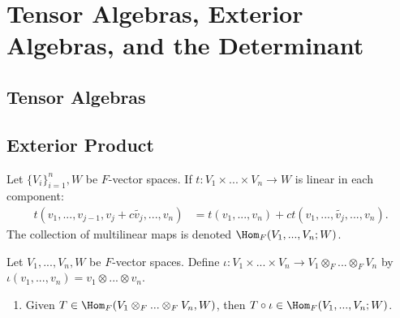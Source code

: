 \chapter{Tensor Algebras, Exterior Algebras, and the Determinant}
\vspace{12pt}
\section{Tensor Algebras}

\section{Exterior Product}
    \begin{definition}
        Let $\{V_i\}_{i=1}^n, W$ be $F$-vector spaces. If $t:V_1 \times ... \times V_n \rightarrow W$ is linear in each component:
            \begin{equation*}
            \begin{split}
                t(v_1,...,v_{j-1},v_j + c\tilde{v_j},...,v_n) 
                & =t(v_1,...,v_n) + ct(v_1,...,\tilde{v_j},...,v_n).
            \end{split}
            \end{equation*}
        The collection of multilinear maps is denoted $\Hom_F(V_1,...,V_n;W)$.
    \end{definition}

    \begin{theorem}
        Let $V_1,...,V_n, W$ be $F$-vector spaces. Define $\iota: V_1 \times ... \times V_n \rightarrow V_1 \otimes_F ... \otimes_F V_n$ by $\iota(v_1,...,v_n) = v_1 \otimes ... \otimes v_n$.
        \begin{enumerate}[label = (\arabic*)]
            \item Given $T \in \Hom_F(V_1 \otimes_F ... \otimes_F V_n, W)$, then $T \circ \iota \in \Hom_F(V_1,...,V_n;W)$.
        \end{enumerate}
    \end{theorem}